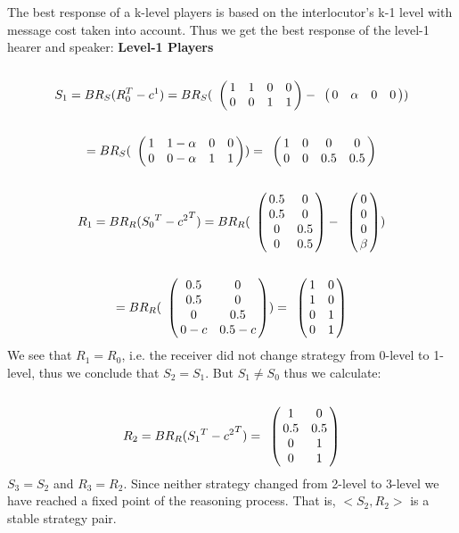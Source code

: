 \documentclass[10pt]{article}
\newcommand{\tb}[1]{\textcolor[rgb]{.8,.33,.0}{[TB: #1]}}%
\begin{document}
The best response of a k-level players is based on the interlocutor's k-1 level with message cost taken into account. %
Thus we get the best response of the level-1 hearer and speaker: %
\textbf{Level-1 Players}\\
\begin{equation*}
S_1= BR_S(R^T_0-c^1)=
BR_S(
\bordermatrix{
            & & & &    \cr
 &       1 &         1 & 0       & 0 \cr
 &       0 &         0 & 1      & 1
 }
-
\bordermatrix{
            & & & &    \cr
 &       0 &         \alpha & 0       & 0 \cr
 }
)
\end{equation*}
\begin{equation*}
=BR_S(
\bordermatrix{
                & & & &    \cr
     &       1 &         1-\alpha & 0       & 0 \cr
     &       0 &         0-\alpha & 1      & 1
 }
 )
=
\bordermatrix{
                 & & & &    \cr
      &       1 &         0 & 0       & 0 \cr
      &       0 &         0 & 0.5      & 0.5
  }
\end{equation*}
\begin{equation*}
R_1=BR_R({S_0}^T-{c^2}^T)=
BR_R(
\bordermatrix{
            &  & \cr
    & 0.5 & 0 \cr
     & 0.5 & 0 \cr
     & 0 & 0.5 \cr
     & 0 & 0.5 \cr
 }
-
\bordermatrix{
  & \cr
    & 0 \cr
     & 0 \cr
     & 0 \cr
     & \beta \cr
 }
)
\end{equation*}
\begin{equation*}
=
BR_R(
\bordermatrix{
            &  & \cr
    & 0.5 & 0 \cr
     & 0.5 & 0 \cr
     & 0 & 0.5 \cr
     & 0-c & 0.5-c \cr
 }
 )
=
\bordermatrix{
            &  & \cr
    & 1 & 0 \cr
     & 1 & 0 \cr
     & 0 & 1 \cr
     & 0 & 1 \cr
 }
\end{equation*}
We see that $R_1=R_0$, i.e. the receiver did not change strategy from 0-level to 1-level, thus we conclude that $S_2=S_1$. But $S_1 \neq S_0$ thus we calculate:
\begin{equation*}
R_2=BR_R({S_1}^T-{c^2}^T)=
\bordermatrix{
            &  & \cr
    & 1 & 0 \cr
     & 0.5 & 0.5 \cr
     & 0 & 1 \cr
     & 0 & 1 \cr
 }
\end{equation*}
$S_3=S_2$ and $R_3=R_2$. Since neither strategy changed from 2-level to 3-level we have reached a fixed point of the reasoning process. That is,  $<S_2,R_2>$ is a stable strategy pair.
\end{document}
